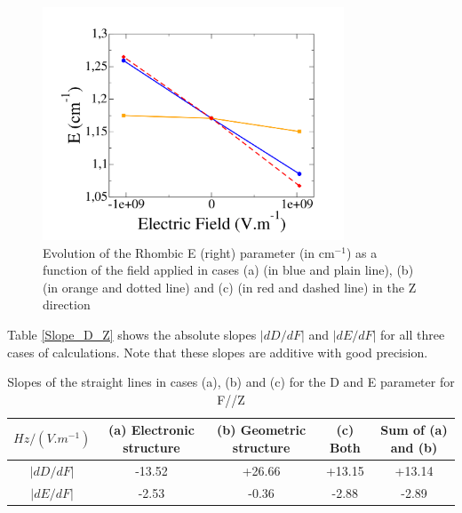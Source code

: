 \documentclass[10pt]{report}
\numberwithin{equation}{section}
\begin{document}
\begin{figure}[!h]
    \centering
    \includegraphics[width=0.8\textwidth]{Images/E_E_Z.png}
    \caption{Evolution of the Rhombic E (right) parameter (in cm$^{-1}$) as a function of the field applied in cases (a) (in blue and plain line), (b) (in orange and dotted line) and (c) (in red and dashed line) in the Z direction}
    \label{fig:Ni_E_Z}
\end{figure}


Table \ref{Slope_D_Z} shows the absolute slopes $|dD/dF|$ and $|dE/dF|$ for all three cases of calculations.
Note that these slopes are additive with good precision.

\begin{table}[!h]
    \begin{tabular}{c | c c c c}
        \hline
        $Hz/(V.m^{-1})$ &  (a) Electronic structure & (b) Geometric structure & (c) Both & Sum of (a) and (b)\\
        \hline
        $|dD/dF|$ & -13.52	& +26.66& 	+13.15 & 	+13.14\\
        $|dE/dF|$ &-2.53& 	-0.36& 	-2.88& 	-2.89\\
    \end{tabular}
    \caption{Slopes of the straight lines in cases (a), (b) and (c) for the D and E parameter for F//Z}
    \label{tab:Slope_D_Z}
\end{table}
\end{document}
